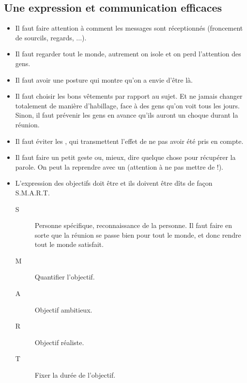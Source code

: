 \subsection{Une expression et communication efficaces}
\begin{itemize}
    \item Il faut faire attention à comment les messages sont réceptionnés (froncement de sourcils, regards, ...).
    \item Il faut regarder tout le monde, autrement on isole et on perd l'attention des gens.
    \item Il faut avoir une posture qui montre qu'on a envie d'être là.
    \item Il faut choisir les bons vêtements par rapport au sujet. Et ne jamais changer totalement de manière d'habillage, face à des gens qu'on voit tous les jours. Sinon, il faut prévenir les gens en avance qu'ils auront un choque durant la réunion.
    \item Il faut éviter les , qui transmettent l'effet de ne pas avoir été pris en compte.
    \item Il faut faire un petit geste ou, mieux, dire quelque chose pour récupérer la parole. On peut la reprendre avec un  (attention à ne pas mettre de  !).
    \item L'expression des objectifs doit être et ils doivent être dîts de façon S.M.A.R.T.
    \begin{description}
        \item[S] Personne spécifique, reconnaissance de la personne. Il faut faire en sorte que la réunion se passe bien pour tout le monde, et donc rendre tout le monde satisfait.
        \item[M] Quantifier l'objectif.
        \item[A] Objectif ambitieux.
        \item[R] Objectif réaliste.
        \item[T] Fixer la durée de l'objectif.
    \end{description}
\end{itemize}
